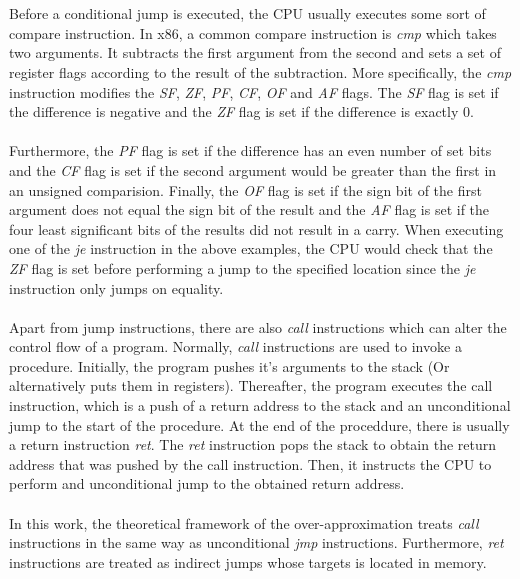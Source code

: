 \documentclass{kththesis}
\begin{document}
\\ \\
Before a conditional jump is executed, the CPU usually executes some sort of compare instruction. In x86, a common compare instruction is \textit{cmp} which takes two arguments. It subtracts the first argument from the second and sets a set of register flags according to the result of the subtraction. More specifically, the \textit{cmp} instruction modifies the \textit{SF}, \textit{ZF}, \textit{PF}, \textit{CF}, \textit{OF} and \textit{AF} flags. The \textit{SF} flag is set if the difference is negative and the \textit{ZF} flag is set if the difference is exactly 0.
\\ \\
Furthermore, the \textit{PF} flag is set if the difference has an even number of set bits and the \textit{CF} flag is set if the second argument would be greater than the first in an unsigned comparision. Finally, the \textit{OF} flag is set if the sign bit of the first argument does not equal the sign bit of the result and the \textit{AF} flag is set if the four least significant bits of the results did not result in a carry. When executing one of the \textit{je} instruction in the above examples, the CPU would check that the \textit{ZF} flag is set before performing a jump to the specified location since the \textit{je} instruction only jumps on equality.
\\ \\
Apart from jump instructions, there are also \textit{call} instructions which can alter the control flow of a program. Normally, \textit{call} instructions are used to invoke a procedure. Initially, the program pushes it's arguments to the stack (Or alternatively puts them in registers). Thereafter, the program executes the call instruction, which is a push of a return address to the stack and an unconditional jump to the start of the procedure. At the end of the proceddure, there is usually a return instruction \textit{ret}. The \textit{ret} instruction pops the stack to obtain the return address that was pushed by the call instruction. Then, it instructs the CPU to perform and unconditional jump to the obtained return address. 
\\ \\ 
In this work, the theoretical framework of the over-approximation treats \textit{call} instructions in the same way as unconditional \textit{jmp} instructions. Furthermore, \textit{ret} instructions are treated as indirect jumps whose targets is located in memory.
\end{document}
